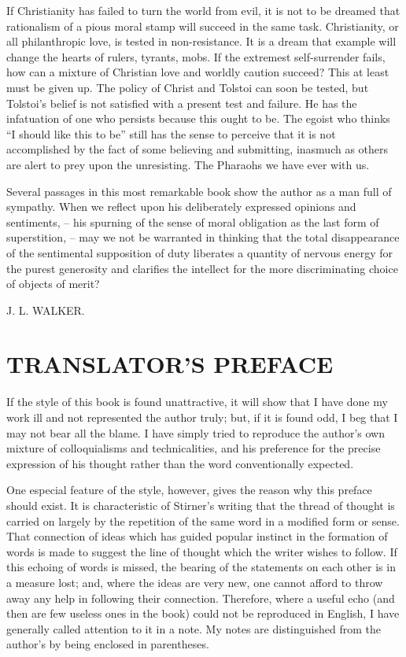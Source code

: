 \documentclass[12pt,a4paper]{book}
\begin{document}
If Christianity has failed to turn the world from evil, it is not to be 
dreamed that rationalism of a pious moral stamp will succeed in the same task. 
Christianity, or all philanthropic love, is tested in non-resistance. It is a 
dream that example will change the hearts of rulers, tyrants, mobs. If the 
extremest self-surrender fails, how can a mixture of Christian love and 
worldly caution succeed? This at least must be given up. The policy of Christ 
and Tolstoi can soon be tested, but Tolstoi's belief is not satisfied with a 
present test and failure. He has the infatuation of one who persists because 
this ought to be. The egoist who thinks ``I should like this to be'' still 
has the sense to perceive that it is not accomplished by the fact of some 
believing and submitting, inasmuch as others are alert to prey upon the 
unresisting. The Pharaohs we have ever with us.

Several passages in this most remarkable book show the author as a man full of 
sympathy. When we reflect upon his deliberately expressed opinions and 
sentiments, -- his spurning of the sense of moral obligation as the last form 
of superstition, -- may we not be warranted in thinking that the total 
disappearance of the sentimental supposition of duty liberates a quantity of 
nervous energy for the purest generosity and clarifies the intellect for the 
more discriminating choice of objects of merit?

\begin{flushright}
J. L. WALKER.\end{flushright}

\chapter[Translator's Preface]{\centering TRANSLATOR'S PREFACE}

If the style of this book is found unattractive, it will show that I have done 
my work ill and not represented the author truly; but, if it is found odd, I 
beg that I may not bear all the blame. I have simply tried to reproduce the 
author's own mixture of colloquialisms and technicalities, and his preference 
for the precise expression of his thought rather than the word conventionally 
expected.

One especial feature of the style, however, gives the reason why this preface 
should exist. It is characteristic of Stirner's writing that the thread of 
thought is carried on largely by the repetition of the same word in a modified 
form or sense. That connection of ideas which has guided popular instinct in 
the formation of words is made to suggest the line of thought which the writer 
wishes to follow. If this echoing of words is missed, the bearing of the 
statements on each other is in a measure lost; and, where the ideas are very 
new, one cannot afford to throw away any help in following their connection. 
Therefore, where a useful echo (and then are few useless ones in the book) 
could not be reproduced in English, I have generally called attention to it in 
a note. My notes are distinguished from the author's by being enclosed in 
parentheses.
\end{document}
